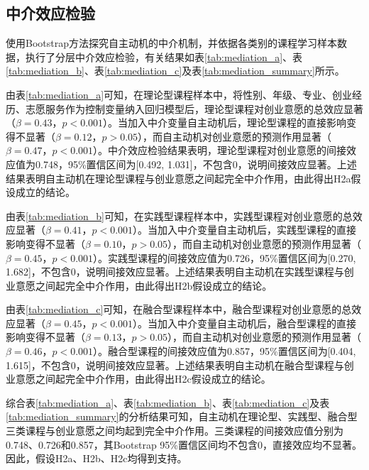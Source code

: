 \subsection{中介效应检验}

使用Bootstrap方法探究自主动机的中介机制，并依据各类别的课程学习样本数据，执行了分层中介效应检验，有关结果如表\ref{tab:mediation_a}、表\ref{tab:mediation_b}、表\ref{tab:mediation_c}及表\ref{tab:mediation_summary}所示。

由表\ref{tab:mediation_a}可知，在理论型课程样本中，将性别、年级、专业、创业经历、志愿服务作为控制变量纳入回归模型后，理论型课程对创业意愿的总效应显著\nolinebreak[3]（$\beta=0.43$，$p<0.001$）。当加入中介变量自主动机后，理论型课程的直接影响变得不显著\nolinebreak[3]（$\beta=0.12$，$p>0.05$），而自主动机对创业意愿的预测作用显著\nolinebreak[3]（$\beta=0.47$，$p<0.001$）。中介效应检验结果表明，理论型课程对创业意愿的间接效应值为0.748，95\%置信区间为[0.492, 1.031]，不包含0，说明间接效应显著。上述结果表明自主动机在理论型课程与创业意愿之间起完全中介作用，由此得出H2a假设成立的结论。

由表\ref{tab:mediation_b}可知，在实践型课程样本中，实践型课程对创业意愿的总效应显著\nolinebreak[3]（$\beta=0.41$，$p<0.001$）。当加入中介变量自主动机后，实践型课程的直接影响变得不显著\nolinebreak[3]（$\beta=0.10$，$p>0.05$），而自主动机对创业意愿的预测作用显著\nolinebreak[3]（$\beta=0.45$，$p<0.001$）。实践型课程的间接效应值为0.726，95\%置信区间为[0.270, 1.682]，不包含0，说明间接效应显著。上述结果表明自主动机在实践型课程与创业意愿之间起完全中介作用，由此得出H2b假设成立的结论。

由表\ref{tab:mediation_c}可知，在融合型课程样本中，融合型课程对创业意愿的总效应显著\nolinebreak[3]（$\beta=0.45$，$p<0.001$）。当加入中介变量自主动机后，融合型课程的直接影响变得不显著\nolinebreak[3]（$\beta=0.13$，$p>0.05$），而自主动机对创业意愿的预测作用显著\nolinebreak[3]（$\beta=0.46$，$p<0.001$）。融合型课程的间接效应值为0.857，95\%置信区间为[0.404, 1.615]，不包含0，说明间接效应显著。上述结果表明自主动机在融合型课程与创业意愿之间起完全中介作用，由此得出H2c假设成立的结论。

综合表\ref{tab:mediation_a}、表\ref{tab:mediation_b}、表\ref{tab:mediation_c}及表\ref{tab:mediation_summary}的分析结果可知，自主动机在理论型、实践型、融合型三类课程与创业意愿之间均起到完全中介作用。三类课程的间接效应值分别为0.748、0.726和0.857，其Bootstrap 95\%置信区间均不包含0，直接效应均不显著。因此，假设H2a、H2b、H2c均得到支持。


